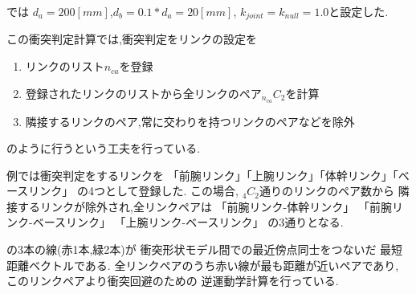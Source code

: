 では
$d_a = 200[mm]$,$d_b = 0.1 * d_a = 20[mm]$,
$k_{joint} = k_{null} = 1.0$と設定した.

この衝突判定計算では,衝突判定をリンクの設定を
\begin{enumerate}
\item リンクのリスト$n_{ca}$を登録
\item 登録されたリンクのリストから全リンクのペア$_{n_{ca}}C_2$を計算
\item 隣接するリンクのペア,常に交わりを持つリンクのペアなどを除外
\end{enumerate}
のように行うという工夫を行っている.




例では衝突判定をするリンクを
「前腕リンク」「上腕リンク」「体幹リンク」「ベースリンク」
の4つとして登録した.
この場合, $_4C_2$通りのリンクのペア数から
隣接するリンクが除外され,全リンクペアは
「前腕リンク-体幹リンク」
「前腕リンク-ベースリンク」
「上腕リンク-ベースリンク」
の3通りとなる.

の3本の線(赤1本,緑2本)が
衝突形状モデル間での最近傍点同士をつないだ
最短距離ベクトルである.
全リンクペアのうち赤い線が最も距離が近いペアであり,
このリンクペアより衝突回避のための
逆運動学計算を行っている.

